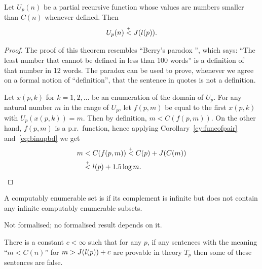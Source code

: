 \begin{theorem}
  \leanok
   \label{thm:nolb}
 Let \( U_{p}(n) \) be a partial recursive function whose values are numbers
smaller than \( C(n) \) whenever defined. Then 
 \[  
 U_{p}(n) \stackrel{{}_+}{<} J(l(p)).
 \]
 \end{theorem}

\begin{proof}
  \leanok
 The proof of this theorem resembles ``Berry's paradox '', which says:
``The least number that cannot be defined in less than 100 words'' is a 
definition of that number in 12 words. 
The paradox can be used to 
prove, whenever we agree on a formal notion of ``definition'', that the 
sentence in quotes is not a definition. 

Let \( x(p,k) \) for \( k=1,2,\ldots \) be an enumeration of the domain of 
\( U_{p} \). For any natural number \( m \) in the range of \( U_{p} \), let \( f(p,m) \) be 
equal to the first \( x(p,k) \) with \( U_{p}(x(p,k)) = m \). Then by definition, 
\( m < C(f(p,m)) \). On the other hand, \( f(p,m) \) is a p.r.~function, hence 
applying Corollary~\ref{cy:funcofpair} and~\eqref{eq:binupbd} we get 
 \begin{align*}
     m	&< C(f(p,m)) \stackrel{{}_+}{<} C(p) + J(C(m))
   \\	&\stackrel{{}_+}{<} l(p) + 1.5\log m. 		
 \end{align*}
 \end{proof}

 \begin{definition}
  \label{def:simple-set}
A computably enumerable set is  if its complement is infinite but
does not contain any infinite computably enumerable subsets. 
 \end{definition}
\begin{formalization}
Not formalised; no formalised result depends on it.
\end{formalization}


\begin{corollary}
  \label{cor:chaitin}
  \leanok
There is a constant \( c<\infty \) such that for any \( p \), if any sentences
with the meaning ``\( m < C(n) \)'' for \( m > J(l(p)) + c \)  are 
provable in theory \( T_{p} \) then some of these sentences are false. 
 \end{corollary}

